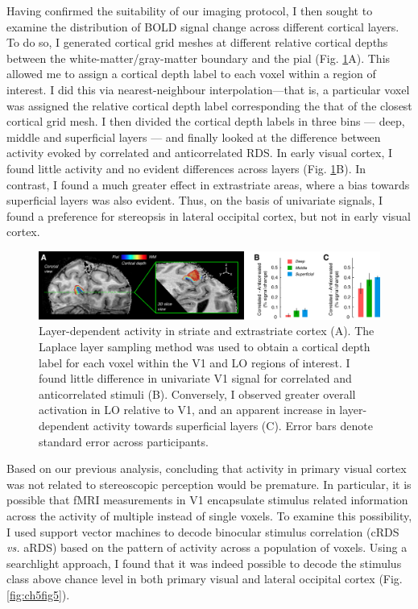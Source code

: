 Having confirmed the suitability of our imaging protocol, I then sought to examine the distribution of BOLD signal change across different cortical layers. To do so, I generated cortical grid meshes at different relative cortical depths between the white-matter/gray-matter boundary and the pial (Fig. \ref{fig:ch5fig4}A). This allowed me to assign a cortical depth label to each voxel within a region of interest. I did this via nearest-neighbour interpolation---that is, a particular voxel was assigned the relative cortical depth label corresponding the that of the closest cortical grid mesh. I then divided the cortical depth labels in three bins --- deep, middle and superficial layers --- and finally looked at the difference between activity evoked by correlated and anticorrelated RDS. In early visual cortex, I found little activity and no evident differences across layers (Fig. \ref{fig:ch5fig4}B). In contrast, I found a much greater effect in extrastriate areas, where a bias towards superficial layers was also evident. Thus, on the basis of univariate signals, I found a preference for stereopsis in lateral occipital cortex, but not in early visual cortex.

\begin{figure}
  \centering
  \includegraphics[keepaspectratio,width=14cm]{Fig4.pdf}
  \caption[Layer-dependent activity in striate and extrastriate cortex.]{Layer-dependent activity in striate and extrastriate cortex (A). The Laplace layer sampling method \cite{Jones:2000cr} was used to obtain a cortical depth label for each voxel within the V1 and LO regions of interest. I found little difference in univariate V1 signal for correlated and anticorrelated stimuli (B). Conversely, I observed greater overall activation in LO relative to V1, and an apparent increase in layer-dependent activity towards superficial layers (C). Error bars denote standard error across participants.}
  \label{fig:ch5fig4}
\end{figure}

Based on our previous analysis, concluding that activity in primary visual cortex was not related to stereoscopic perception would be premature. In particular, it is possible that fMRI measurements in V1 encapsulate stimulus related information across the activity of multiple instead of single voxels. To examine this possibility, I used support vector machines to decode binocular stimulus correlation (cRDS \textit{vs.} aRDS) based on the pattern of activity across a population of voxels. Using a searchlight approach, I found that it was indeed possible to decode the stimulus class above chance level in both primary visual and lateral occipital cortex (Fig. \ref{fig:ch5fig5}).


